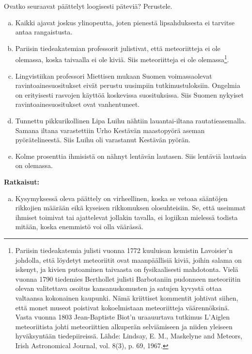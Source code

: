 \begin{esimerkki}
    Ovatko seuraavat päättelyt loogisesti päteviä? Perustele.
    \begin{enumerate}[a)]
        \item Kaikki ajavat joskus ylinopeutta, joten pienestä lipsahduksesta ei tarvitse antaa rangaistusta.
        \item Pariisin tiedeakatemian professorit julistivat, että meteoriitteja ei ole olemassa,
            koska taivaalla ei ole kiviä.
            Siis meteoriitteja ei ole olemassa\footnote{Pariisin tiedeakatemia julisti vuonna 1772
            kuuluisan kemistin Lavoisier'n johdolla, että löydetyt meteoriitit ovat maanpäällisiä kiviä,
            joihin salama on iskenyt, ja kivien putoaminen taivaasta on fysikaalisesti mahdotonta.
            Vielä vuonna 1790 tiedemies Berthollet julisti Barbotaniin pudonneen meteoriitin olevan valitettava
            osoitus kansanuskomusten ja satujen kyvystä ottaa valtaansa kokonainen kaupunki.
            Nämä kriittiset kommentit johtivat siihen, että monet museot poistivat kokoelmistaan meteoriitteja 
            väärennöksinä.
            Vasta vuonna 1803 Jean-Baptiste Biot'n uraauurtava tutkimus L'Aiglen meteoriitista johti meteoriittien 
            alkuperän selviämiseen ja niiden yleiseen hyväksyntään tiedepiireissä.
            Lähde: Lindsay, E. M., Maskelyne and Meteors, Irish Astronomical Journal, vol. 8(3), p. 69, 1967.}.
        \item Lingvistiikan professori Miettisen mukaan Suomen voimassaolevat ravintoainesuositukset eivät perustu 
            uusimpiin tutkimustuloksiin.
            Ongelmia on erityisesti rasvojen käyttöä koskevissa suosituksissa.
            Siis Suomen nykyiset ravintoainesuositukset ovat vanhentuneet.
        \item Tunnettu pikkurikollinen Lipa Luihu nähtiin lauantai-iltana rautatieasemalla.
            Samana iltana varastettiin Urho Kestävän maastopyörä aseman pyörätelineestä.
            Siis Luihu oli varastanut Kestävän pyörän.
        \item Kolme prosenttia ihmisistä on nähnyt lentävän lautasen. Siis lentäviä lautasia on olemassa.
    \end{enumerate}
    \textbf{Ratkaisut:}
        \begin{enumerate}[a)]
            \item Kysymyksessä oleva päättely on virheellinen, koska se vetoaa sääntöjen rikkojien määrään eikä
                kyseisen rikkomuksen olosuhteisiin.
                Se, että useimmat ihmiset toimivat tai ajattelevat jollakin tavalla, ei logiikan mielessä todista
                mitään, koska enemmistö voi olla väärässä.
                

\end{enumerate}
\end{esimerkki}

